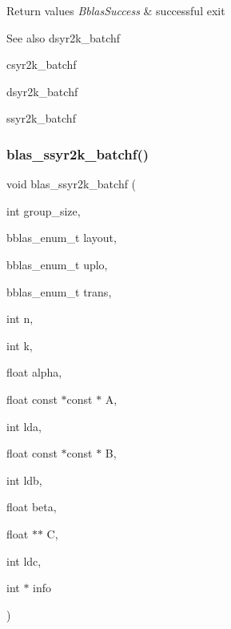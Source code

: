 \begin{DoxyRetVals}{Return values}
{\em Bblas\+Success} & successful exit\\
\hline
\end{DoxyRetVals}
\begin{DoxySeeAlso}{See also}
dsyr2k\+\_\+batchf 

csyr2k\+\_\+batchf 

dsyr2k\+\_\+batchf 

ssyr2k\+\_\+batchf 
\end{DoxySeeAlso}
\mbox{\label{group__syr2k__batchf_ga675940b5ea241293de1b9b363efe05ff}} 
\subsubsection{\texorpdfstring{blas\+\_\+ssyr2k\+\_\+batchf()}{blas\_ssyr2k\_batchf()}}
{\footnotesize\ttfamily void blas\+\_\+ssyr2k\+\_\+batchf (\begin{DoxyParamCaption}\item[{int}]{group\+\_\+size,  }\item[{bblas\+\_\+enum\+\_\+t}]{layout,  }\item[{bblas\+\_\+enum\+\_\+t}]{uplo,  }\item[{bblas\+\_\+enum\+\_\+t}]{trans,  }\item[{int}]{n,  }\item[{int}]{k,  }\item[{float}]{alpha,  }\item[{float const $\ast$const $\ast$}]{A,  }\item[{int}]{lda,  }\item[{float const $\ast$const $\ast$}]{B,  }\item[{int}]{ldb,  }\item[{float}]{beta,  }\item[{float $\ast$$\ast$}]{C,  }\item[{int}]{ldc,  }\item[{int $\ast$}]{info }\end{DoxyParamCaption})}

